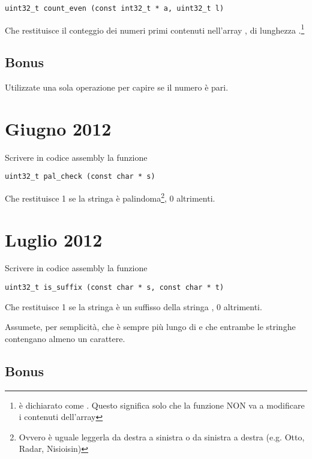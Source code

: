 \documentclass[a4paper]{memoir}
\begin{document}
    \begin{lstlisting}
uint32_t count_even (const int32_t * a, uint32_t l)
    \end{lstlisting}
    
    Che restituisce il conteggio dei numeri primi contenuti nell'array , di lunghezza .\footnote{
    è dichiarato come . Questo significa solo che la funzione NON va a modificare i contenuti dell'array}
    
    \subsection{Bonus}
    
      Utilizzate una sola operazione per capire se il numero è pari.
      
	\section{Giugno 2012}
	
	  Scrivere in codice assembly la funzione
    
    \begin{lstlisting}
uint32_t pal_check (const char * s)
    \end{lstlisting}
	
	  Che restituisce 1 se la stringa  è palindoma\footnote{Ovvero è uguale leggerla da destra a sinistra o da
	  sinistra a destra (e.g. Otto, Radar, Nisioisin)}, 0 altrimenti.
	  
	\section{Luglio 2012}
	
	  Scrivere in codice assembly la funzione
    
    \begin{lstlisting}
uint32_t is_suffix (const char * s, const char * t)
    \end{lstlisting}
    
    Che restituisce 1 se la stringa  è un suffisso della stringa , 0 altrimenti.
    
    Assumete, per semplicità, che  è sempre più lungo di  e che entrambe le stringhe contengano
    almeno un carattere.
    
    \subsection{Bonus}
      
\end{document}
